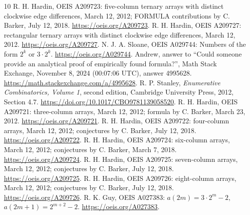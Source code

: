 \documentclass[11pt]{article}
\begin{document}
\begin{thebibliography}{10}
 R. H. Hardin, OEIS A209723: five-column ternary arrays with
distinct clockwise edge differences, March 12, 2012; FORMULA contributions
by C. Barker, July 12, 2018. \url{https://oeis.org/A209723}.
 R. H. Hardin, OEIS A209727: rectangular ternary arrays with
distinct clockwise edge differences, March 12, 2012.
\url{https://oeis.org/A209727}.
 N. J. A. Sloane, OEIS A029744: Numbers of the form
$2^k$ or $3\cdot2^k$. \url{https://oeis.org/A029744}.
 Andrew, answer to ``Could someone provide an analytical
proof of empirically found formula?'', Math Stack Exchange, November 8, 2024
(00:07:06 UTC),
answer 4995628. \url{https://math.stackexchange.com/a/4995628}.
 R. P. Stanley, \emph{Enumerative Combinatorics, Volume 1},
second edition, Cambridge University Press, 2012, Section 4.7.
\url{https://doi.org/10.1017/CBO9781139058520}.
 R. H. Hardin, OEIS A209721: three-column arrays,
March 12, 2012; formula by C. Barker, March 23, 2012.
\url{https://oeis.org/A209721}.
 R. H. Hardin, OEIS A209722: four-column arrays,
March 12, 2012; conjectures by C. Barker, July 12, 2018.
\url{https://oeis.org/A209722}.
 R. H. Hardin, OEIS A209724: six-column arrays,
March 12, 2012; conjectures by C. Barker, March 7, 2018.
\url{https://oeis.org/A209724}.
 R. H. Hardin, OEIS A209725: seven-column arrays,
March 12, 2012; conjectures by C. Barker, July 12, 2018.
\url{https://oeis.org/A209725}.
 R. H. Hardin, OEIS A209726: eight-column arrays,
March 12, 2012; conjectures by C. Barker, July 12, 2018.
\url{https://oeis.org/A209726}.
 R. K. Guy, OEIS A027383:
$a(2m)=3\cdot2^m-2$, $a(2m+1)=2^{m+2}-2$.
\url{https://oeis.org/A027383}.
\end{thebibliography}
\end{document}
